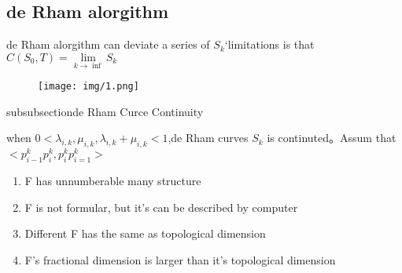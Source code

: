 \newpage


\subsection{de Rham alorgithm}
de Rham alorgithm can deviate a series of $S_k$‘limitations is that $C(S_0,T) = \lim\limits_{k\rightarrow \inf}S_k$


\begin{figure}
	\begin{center}
		\texttt{[image: img/1.png]}
	\end{center}
	\caption{}\label{fig:}
\end{figure}

subsubsection{de Rham Curce Continuity}

\begin{property}[Continuity]
	when $0<\lambda _{i,k},\mu_{i,k},\lambda_{i,k}+\mu_{i,k}<1$,de Rham curves $S_k$ is continuted。Assum that $<p_{i-1}^{k}p_{i}^{k},p_{i}^{k}p_{i=1}^{k}>$
\end{property}

\begin{property}
	\begin{enumerate}
		\item F has unnumberable many structure
		\item F is not formular, but it's can be described by computer
		\item Different F has the same as topological dimension
		\item F's fractional dimension is larger than it's topological dimension
	\end{enumerate}
\end{property}

